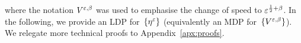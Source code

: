 where the notation $V^{\varepsilon,\beta}$ was used to emphasise the change of speed to $\varepsilon^{\frac12+\beta}$. 
In the following, we provide an LDP for~$\{\eta^\varepsilon\}$ (equivalently an MDP for~$\{V^{\varepsilon,\beta}\}$). We relegate more technical proofs to Appendix~\ref{apx:proofs}.

